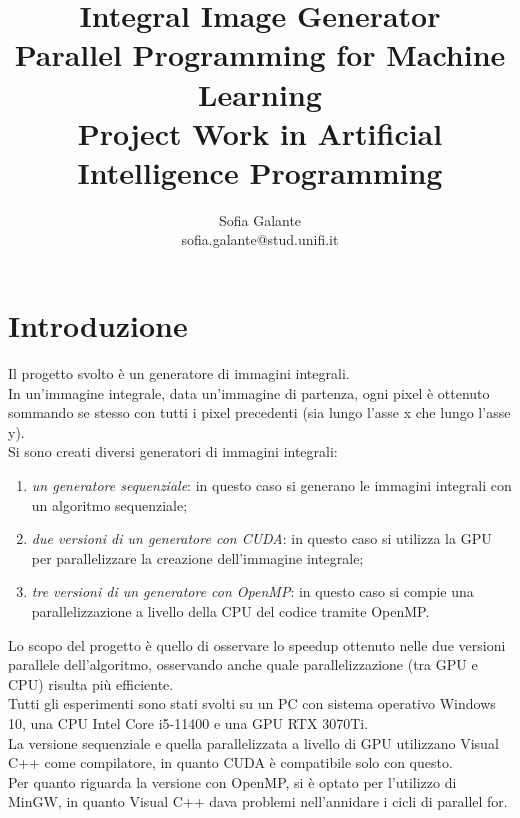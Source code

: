 \documentclass[10pt,twocolumn,letterpaper]{article}
\begin{document}
\title{Integral Image Generator\\
\large Parallel Programming for Machine Learning\\Project Work in Artificial Intelligence Programming}

\author{Sofia Galante\\
\small sofia.galante@stud.unifi.it\\
}
\date{}
\maketitle
\thispagestyle{empty}

\section{Introduzione}

Il progetto svolto è un generatore di immagini integrali.\\
In un’immagine integrale, data un’immagine di partenza, ogni pixel è ottenuto sommando se stesso con tutti i pixel precedenti (sia lungo l’asse x che lungo l’asse y).\\
Si sono creati diversi generatori di immagini integrali:
\begin{enumerate}
\item{\textit{un generatore sequenziale}: in questo caso si generano le immagini integrali con un algoritmo sequenziale;}
\item{\textit{due versioni di un generatore con CUDA}: in questo caso si utilizza la GPU per parallelizzare la creazione dell’immagine integrale;}
\item{\textit{tre versioni di un generatore con OpenMP}: in questo caso si compie una parallelizzazione a livello della CPU del codice tramite OpenMP.}
\end{enumerate}
Lo scopo del progetto è quello di osservare lo speedup ottenuto nelle due versioni parallele dell’algoritmo, osservando anche quale parallelizzazione (tra GPU e CPU) risulta più efficiente.\\
Tutti gli esperimenti sono stati svolti su un PC con sistema operativo Windows 10, una CPU Intel Core i5-11400 e una GPU RTX 3070Ti.\\
La versione sequenziale e quella parallelizzata a livello di GPU utilizzano Visual C++ come compilatore, in quanto CUDA è compatibile solo con questo.\\
Per quanto riguarda la versione con OpenMP, si è optato per l’utilizzo di MinGW, in quanto Visual C++ dava problemi nell’annidare i cicli di parallel for.
\end{document}
